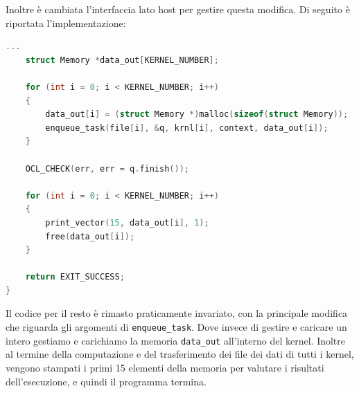 Inoltre è cambiata l'interfaccia lato host per gestire questa  modifica. Di seguito è riportata l'implementazione:
\begin{lstlisting}[language=C]
...
	struct Memory *data_out[KERNEL_NUMBER];

	for (int i = 0; i < KERNEL_NUMBER; i++)
	{
		data_out[i] = (struct Memory *)malloc(sizeof(struct Memory));
		enqueue_task(file[i], &q, krnl[i], context, data_out[i]);
	}

	OCL_CHECK(err, err = q.finish());

	for (int i = 0; i < KERNEL_NUMBER; i++)
	{
		print_vector(15, data_out[i], 1);
		free(data_out[i]);
	}

	return EXIT_SUCCESS;
}
\end{lstlisting}

Il codice per il resto è rimasto praticamente invariato, con la principale modifica che riguarda gli argomenti di \texttt{enqueue\_task}. Dove invece di gestire e caricare un intero gestiamo e carichiamo la memoria \texttt{data\_out} all'interno del kernel. Inoltre al termine della computazione e del trasferimento dei file dei dati di tutti i kernel, vengono stampati i primi 15 elementi della memoria per valutare i risultati dell'esecuzione, e quindi il programma termina.